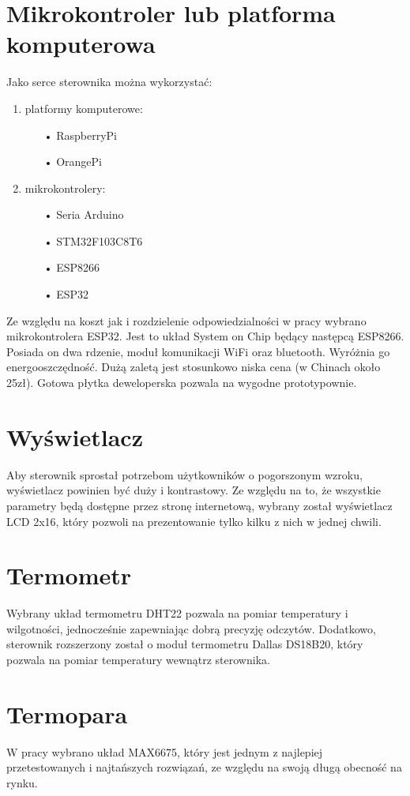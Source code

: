 \documentclass[11pt]{report}
\begin{document}
 \section{Mikrokontroler lub platforma komputerowa}
 Jako serce sterownika można wykorzystać:
 \begin{enumerate}
 \item platformy komputerowe:
 \begin{enumerate}
 \item[•] RaspberryPi
 \item[•] OrangePi
 \end{enumerate}
\item mikrokontrolery:
 \begin{enumerate}
 \item[•] Seria Arduino
 \item[•] STM32F103C8T6
 \item[•] ESP8266
 \item[•] ESP32
 \end{enumerate}
 \end{enumerate}
 Ze względu na koszt jak i rozdzielenie odpowiedzialności w pracy wybrano mikrokontrolera ESP32. Jest to układ System on Chip będący następcą ESP8266. Posiada on dwa rdzenie, moduł komunikacji WiFi oraz bluetooth. Wyróżnia go energooszczędność. Dużą zaletą jest stosunkowo niska cena (w Chinach około 25zł). Gotowa płytka deweloperska pozwala na wygodne prototypownie.
 
 \section{Wyświetlacz}
 Aby sterownik sprostał potrzebom użytkowników o pogorszonym wzroku, wyświetlacz powinien być duży i kontrastowy.
 Ze względu na to, że wszystkie parametry będą dostępne przez stronę internetową, wybrany został wyświetlacz LCD 2x16, który pozwoli na prezentowanie tylko kilku z nich w jednej chwili.
 
 \section{Termometr}
 Wybrany układ termometru DHT22 pozwala na pomiar temperatury i wilgotności, jednocześnie zapewniając dobrą precyzję odczytów. Dodatkowo, sterownik rozszerzony został o moduł termometru Dallas DS18B20, który pozwala na pomiar temperatury wewnątrz sterownika.
 
 \section{Termopara}
 W pracy wybrano układ MAX6675, który jest jednym z najlepiej przetestowanych i najtańszych rozwiązań, ze względu na swoją długą obecność na rynku.
 
\end{document}
